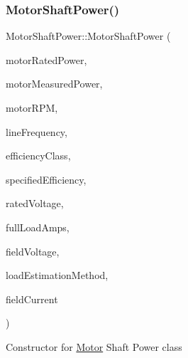 \subsubsection{\texorpdfstring{Motor\+Shaft\+Power()}{MotorShaftPower()}\hspace{0.1cm}{\footnotesize\ttfamily [2/3]}}
{\footnotesize\ttfamily Motor\+Shaft\+Power\+::\+Motor\+Shaft\+Power (\begin{DoxyParamCaption}\item[{double}]{motor\+Rated\+Power,  }\item[{double}]{motor\+Measured\+Power,  }\item[{int}]{motor\+R\+PM,  }\item[{\hyperlink{class_motor_acee1bdf1b684ad36cb80dc2829d9fcee}{Motor\+::\+Line\+Frequency}}]{line\+Frequency,  }\item[{\hyperlink{class_motor_afa022971ae062406a9f588c601673d4e}{Motor\+::\+Efficiency\+Class}}]{efficiency\+Class,  }\item[{double}]{specified\+Efficiency,  }\item[{double}]{rated\+Voltage,  }\item[{double}]{full\+Load\+Amps,  }\item[{double}]{field\+Voltage,  }\item[{\hyperlink{class_field_data_a424e89914ba5684c01bb269dbe3312fd}{Field\+Data\+::\+Load\+Estimation\+Method}}]{load\+Estimation\+Method,  }\item[{double}]{field\+Current }\end{DoxyParamCaption})\hspace{0.3cm}{\ttfamily [inline]}}

Constructor for \hyperlink{class_motor}{Motor} Shaft Power class


